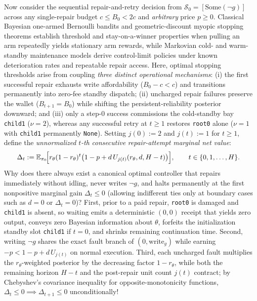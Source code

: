 \documentclass[11pt,letterpaper]{article}
\begin{document}
Now consider the sequential repair-and-retry decision from
\(\mathcal{S}_0 = [\mathrm{Some}(\neg g)]\) across any single-repair
budget \(c \le B_0 < 2c\) and \emph{arbitrary} price \(p \ge 0\).
Classical Bayesian one-armed Bernoulli bandits \citep{berryFristedt1979}
and geometric-discount myopic stopping theorems
\citep{fristedtBerry1988} establish threshold and stay-on-a-winner
properties when pulling an arm repeatedly yields stationary arm rewards,
while Markovian cold- and warm-standby maintenance models
\citep{barronYechiali2017} derive control-limit policies under known
deterioration rates and repeatable repair access. Here, optimal stopping
thresholds arise from coupling \emph{three distinct operational
mechanisms}: (i) the first successful repair exhausts write
affordability (\(B_0 - c < c\)) and transitions permanently into
zero-fee standby dispatch; (ii) uncharged repair failures preserve the
wallet (\(B_{t+1} = B_0\)) while shifting the persistent-reliability
posterior downward; and (iii) only a step-\(0\) success commissions the
cold-standby bay \texttt{child1} (\(\nu = 2\)), whereas any successful
retry at \(t \ge 1\) restores \texttt{root0} alone (\(\nu = 1\) with
\texttt{child1} permanently \texttt{None}). Setting \(j(0) := 2\) and
\(j(t) := 1\) for \(t \ge 1\), define the \emph{unnormalized \(t\)-th
consecutive repair-attempt marginal net value}:
\[\Delta_t := \mathbb{E}_{\pi_0}\!\Bigl[r_\theta (1 - r_\theta)^t \bigl(1 - p + d\, U_{j(t)}(r_\theta, d, H - t)\bigr)\Bigr], \qquad t \in \{0, 1, \dots, H\}.\]
Why does there always exist a canonical optimal controller that repairs
immediately without idling, never writes \(\neg g\), and halts
permanently at the first nonpositive marginal gain \(\Delta_t \le 0\)
(allowing indifferent ties only at boundary cases such as \(d = 0\) or
\(\Delta_t = 0\))? First, prior to a paid repair, \texttt{root0} is
damaged and \texttt{child1} is absent, so waiting emits a deterministic
\((0,0)\) receipt that yields zero output, conveys zero Bayesian
information about \(\theta\), forfeits the initialization standby slot
\texttt{child1} if \(t = 0\), and shrinks remaining continuation time.
Second, writing \(\neg g\) shares the exact fault branch of
\((0, \mathrm{write}_g)\) while earning \(-p < 1 - p + d\,U_{j(t)}\) on
normal execution. Third, each uncharged fault multiplies the
\(r_\theta\)-weighted posterior by the decreasing factor
\(1 - r_\theta\), while both the remaining horizon \(H - t\) and the
post-repair unit count \(j(t)\) contract; by Chebyshev's covariance
inequality for opposite-monotonicity functions,
\(\Delta_t \le 0 \implies \Delta_{t+1} \le 0\) unconditionally!
\end{document}
